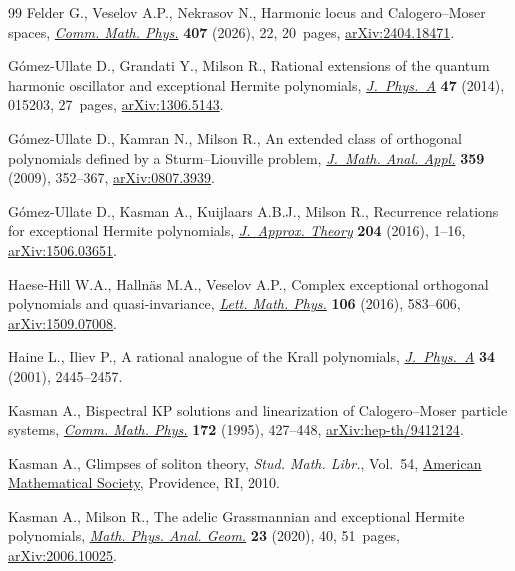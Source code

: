\documentclass[10pt,a4paper]{amsart}
\numberwithin{equation}{section}
\theoremstyle{definition}
\begin{document}
\begin{thebibliography}{99}
Felder G., Veselov A.P., Nekrasov N., Harmonic locus and {C}alogero--{M}oser
 spaces, \href{https://doi.org/10.1007/s00220-025-05522-z}{\textit{Comm. Math.
 Phys.}} \textbf{407} (2026), 22, 20~pages,
 \href{http://arxiv.org/abs/2404.18471}{arXiv:2404.18471}.

G\'omez-Ullate D., Grandati Y., Milson R., Rational extensions of the quantum
 harmonic oscillator and exceptional {H}ermite polynomials,
 \href{https://doi.org/10.1088/1751-8113/47/1/015203}{\textit{J.~Phys.~A}}
 \textbf{47} (2014), 015203, 27~pages,
 \href{http://arxiv.org/abs/1306.5143}{arXiv:1306.5143}.

G\'omez-Ullate D., Kamran N., Milson R., An extended class of orthogonal
 polynomials defined by a {S}turm--{L}iouville problem,
 \href{https://doi.org/10.1016/j.jmaa.2009.05.052}{\textit{J.~Math. Anal.
 Appl.}} \textbf{359} (2009), 352--367,
 \href{http://arxiv.org/abs/0807.3939}{arXiv:0807.3939}.

G\'omez-Ullate D., Kasman A., Kuijlaars A.B.J., Milson R., Recurrence relations
 for exceptional {H}ermite polynomials,
 \href{https://doi.org/10.1016/j.jat.2015.12.003}{\textit{J.~Approx. Theory}}
 \textbf{204} (2016), 1--16,
 \href{http://arxiv.org/abs/1506.03651}{arXiv:1506.03651}.

Haese-Hill W.A., Halln\"as M.A., Veselov A.P., Complex exceptional orthogonal
 polynomials and quasi-invariance,
 \href{https://doi.org/10.1007/s11005-016-0828-8}{\textit{Lett. Math. Phys.}}
 \textbf{106} (2016), 583--606,
 \href{http://arxiv.org/abs/1509.07008}{arXiv:1509.07008}.

Haine L., Iliev P., A rational analogue of the {K}rall polynomials,
\href{https://doi.org/10.1088/0305-4470/34/11/333}{\textit{J.~Phys.~A}} \textbf{34} (2001), 2445--2457.

Kasman A., Bispectral {KP} solutions and linearization of {C}alogero--{M}oser
 particle systems, \href{https://doi.org/10.1007/BF02099435}{\textit{Comm.
 Math. Phys.}} \textbf{172} (1995), 427--448,
 \href{http://arxiv.org/abs/hep-th/9412124}{arXiv:hep-th/9412124}.

Kasman A., Glimpses of soliton theory, \textit{Stud. Math. Libr.}, Vol.~54,
 \href{https://doi.org/10.1090/stml/054}{American Mathematical Society},
 Providence, RI, 2010.

Kasman A., Milson R., The adelic {G}rassmannian and exceptional {H}ermite
 polynomials, \href{https://doi.org/10.1007/s11040-020-09365-z}{\textit{Math.
 Phys. Anal. Geom.}} \textbf{23} (2020), 40, 51~pages,
 \href{http://arxiv.org/abs/2006.10025}{arXiv:2006.10025}.


\end{thebibliography}
\end{document}
